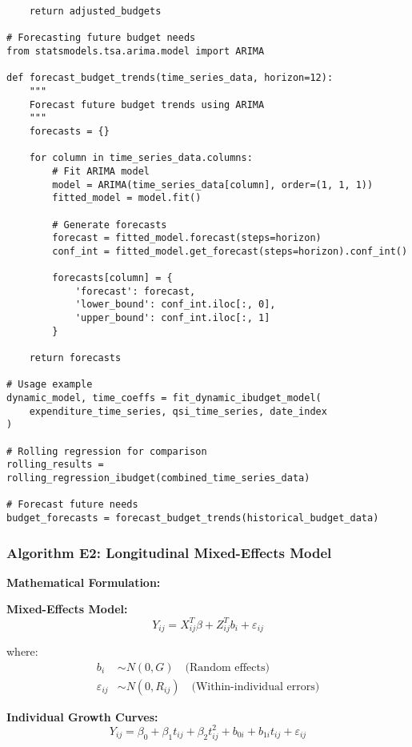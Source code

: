 \documentclass[12pt]{article}
\begin{document}
\begin{lstlisting}
    return adjusted_budgets

# Forecasting future budget needs
from statsmodels.tsa.arima.model import ARIMA

def forecast_budget_trends(time_series_data, horizon=12):
    """
    Forecast future budget trends using ARIMA
    """
    forecasts = {}
    
    for column in time_series_data.columns:
        # Fit ARIMA model
        model = ARIMA(time_series_data[column], order=(1, 1, 1))
        fitted_model = model.fit()
        
        # Generate forecasts
        forecast = fitted_model.forecast(steps=horizon)
        conf_int = fitted_model.get_forecast(steps=horizon).conf_int()
        
        forecasts[column] = {
            'forecast': forecast,
            'lower_bound': conf_int.iloc[:, 0],
            'upper_bound': conf_int.iloc[:, 1]
        }
    
    return forecasts

# Usage example
dynamic_model, time_coeffs = fit_dynamic_ibudget_model(
    expenditure_time_series, qsi_time_series, date_index
)

# Rolling regression for comparison
rolling_results = rolling_regression_ibudget(combined_time_series_data)

# Forecast future needs
budget_forecasts = forecast_budget_trends(historical_budget_data)
\end{lstlisting}

\subsubsection{Algorithm E2: Longitudinal Mixed-Effects Model}

\textbf{Mathematical Formulation:}

\textbf{Mixed-Effects Model:}
\begin{equation}
Y_{ij} = X_{ij}^T\beta + Z_{ij}^T b_i + \varepsilon_{ij}
\end{equation}

where:
\begin{align}
b_i &\sim N(0, G) \quad \text{(Random effects)} \\
\varepsilon_{ij} &\sim N(0, R_{ij}) \quad \text{(Within-individual errors)}
\end{align}

\textbf{Individual Growth Curves:}
\begin{equation}
Y_{ij} = \beta_0 + \beta_1 t_{ij} + \beta_2 t_{ij}^2 + b_{0i} + b_{1i}t_{ij} + \varepsilon_{ij}
\end{equation}
\end{document}
